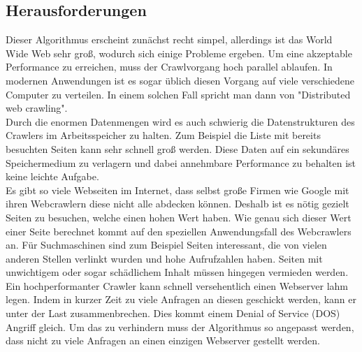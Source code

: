 \subsection{Herausforderungen}
Dieser Algorithmus erscheint zunächst recht simpel, allerdings ist das World Wide Web sehr groß, wodurch sich einige Probleme ergeben. %
Um eine akzeptable Performance zu erreichen, muss der Crawlvorgang hoch parallel ablaufen. In modernen Anwendungen ist es sogar üblich diesen Vorgang auf viele verschiedene Computer zu verteilen. In einem solchen Fall spricht man dann von "Distributed web crawling". \\
Durch die enormen Datenmengen wird es auch schwierig die Datenstrukturen des Crawlers im Arbeitsspeicher zu halten. Zum Beispiel die Liste mit bereits besuchten Seiten kann sehr schnell groß werden. Diese Daten auf ein sekundäres Speichermedium zu verlagern und dabei annehmbare Performance zu behalten ist keine leichte Aufgabe. \\
Es gibt so viele Webseiten im Internet, dass selbst große Firmen wie Google mit ihren Webcrawlern diese nicht alle abdecken können. Deshalb ist es nötig gezielt Seiten zu besuchen, welche einen hohen Wert haben. Wie genau sich dieser Wert einer Seite berechnet kommt auf den speziellen Anwendungsfall des Webcrawlers an. Für Suchmaschinen sind zum Beispiel Seiten interessant, die von vielen anderen Stellen verlinkt wurden und hohe Aufrufzahlen haben. Seiten mit unwichtigem oder sogar schädlichem Inhalt müssen hingegen vermieden werden. \\
Ein hochperformanter Crawler kann schnell versehentlich einen Webserver lahm legen. Indem in kurzer Zeit zu viele Anfragen an diesen geschickt werden, kann er unter der Last zusammenbrechen. Dies kommt einem Denial of Service (DOS) Angriff gleich. Um das zu verhindern muss der Algorithmus so angepasst werden, dass nicht zu viele Anfragen an einen einzigen Webserver gestellt werden.



